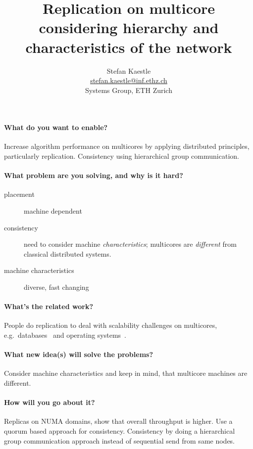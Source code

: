 \documentclass{article}
\begin{document}
\title{Replication on multicore considering hierarchy and
  characteristics of the network}

\newcommand{\eaddr}{stefan.kaestle@inf.ethz.ch}
\newcommand{\email}{\href{mailto:\eaddr}{\eaddr}}

\author{Stefan Kaestle\\
  \email \\
  Systems Group, ETH Zurich}

\maketitle

\paragraph{What do you want to enable?} Increase algorithm performance
on multicores by applying distributed principles, particularly
replication. Consistency using hierarchical group communication.

\paragraph{What problem are you solving, and why is it hard?}
\begin{description}
\item[placement] machine dependent
\item[consistency] need to consider machine \emph{characteristics};
  multicores are \emph{different} from classical distributed systems.
\item[machine characteristics] diverse, fast changing
\end{description}

\paragraph{What's the related work?} People do replication to deal
with scalability challenges on multicores, e.g.\
databases~\cite{Salomie2011, Wiesmann2000} and operating
systems~\cite{fos:osr09, tornado:osdi99, barrelfish:sosp09}.

\paragraph{What new idea(s) will solve the problems?} Consider machine
characteristics and keep in mind, that multicore machines are
different. 

\paragraph{How will you go about it?} Replicas on NUMA domains, show
that overall throughput is higher. Use a quorum based approach for
consistency. Consistency by doing a hierarchical group communication
approach instead of sequential send from same nodes.
\end{document}
